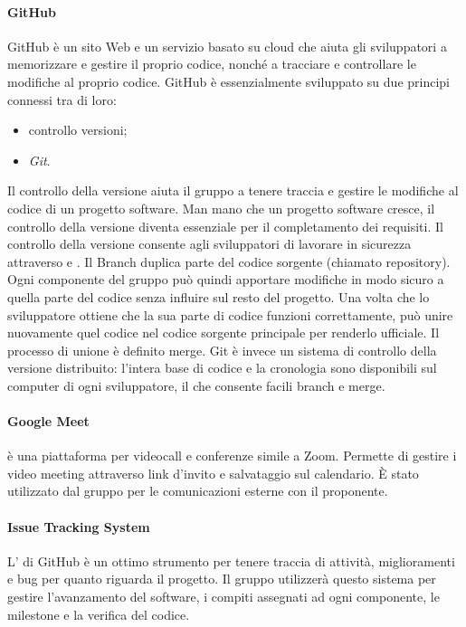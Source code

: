 \paragraph{GitHub}
GitHub è un sito Web e un servizio basato su cloud che aiuta gli sviluppatori a memorizzare e gestire il proprio codice, nonché a tracciare e controllare le modifiche al proprio codice. GitHub è essenzialmente sviluppato su due principi connessi tra di loro:
\begin{itemize}
    \item controllo versioni;
    \item \textit{Git}.
\end{itemize}
Il controllo della versione aiuta il gruppo a tenere traccia e gestire le modifiche al codice di un progetto software. Man mano che un progetto software cresce, il controllo della versione diventa essenziale per il completamento dei requisiti. Il controllo della versione consente agli sviluppatori di lavorare in sicurezza attraverso  e . Il Branch duplica parte del codice sorgente (chiamato repository). Ogni componente del gruppo può quindi apportare modifiche in modo sicuro a quella parte del codice senza influire sul resto del progetto. Una volta che lo sviluppatore ottiene che la sua parte di codice funzioni correttamente, può unire nuovamente quel codice nel codice sorgente principale per renderlo ufficiale. Il processo di unione è definito merge.
Git è invece un sistema di controllo della versione distribuito: l'intera base di codice e la cronologia sono disponibili sul computer di ogni sviluppatore, il che consente facili branch e merge.

\paragraph{Google Meet}
 è una piattaforma per videocall e conferenze simile a Zoom. Permette di gestire i video meeting attraverso link d'invito e salvataggio sul calendario. È stato utilizzato dal gruppo per le comunicazioni esterne con il proponente.

\paragraph{Issue Tracking System}
L' di GitHub è un ottimo strumento per tenere traccia di attività, miglioramenti e bug per quanto riguarda il progetto. Il gruppo utilizzerà questo sistema per gestire l'avanzamento del software, i compiti assegnati ad ogni componente, le milestone e la verifica del codice.

